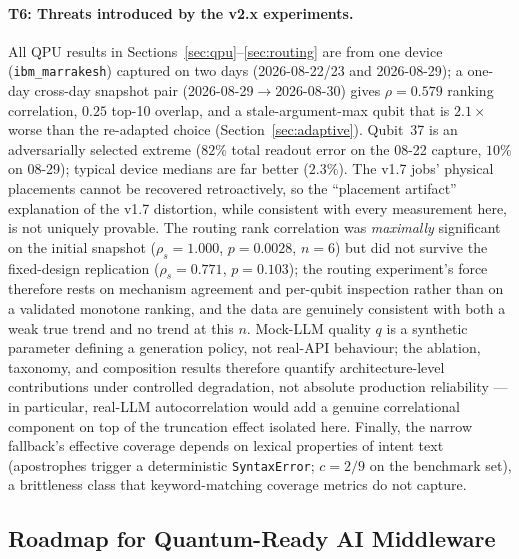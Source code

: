 ﻿\documentclass[12pt,a4paper]{article}
\begin{document}
\paragraph{T6: Threats introduced by the v2.x experiments.} All QPU results in Sections~\ref{sec:qpu}--\ref{sec:routing} are from one device (\texttt{ibm\_marrakesh}) captured on two days (2026-08-22/23 and 2026-08-29); a one-day cross-day snapshot pair (2026-08-29$\to$2026-08-30) gives $\rho{=}0.579$ ranking correlation, $0.25$ top-10 overlap, and a stale-argument-max qubit that is $2.1\times$ worse than the re-adapted choice (Section~\ref{sec:adaptive}). Qubit~37 is an adversarially selected extreme ($82\%$ total readout error on the 08-22 capture, $10\%$ on 08-29); typical device medians are far better ($2.3\%$). The v1.7 jobs' physical placements cannot be recovered retroactively, so the ``placement artifact'' explanation of the v1.7 distortion, while consistent with every measurement here, is not uniquely provable. The routing rank correlation was \emph{maximally} significant on the initial snapshot ($\rho_s = 1.000$, $p = 0.0028$, $n{=}6$) but did not survive the fixed-design replication ($\rho_s = 0.771$, $p = 0.103$); the routing experiment's force therefore rests on mechanism agreement and per-qubit inspection rather than on a validated monotone ranking, and the data are genuinely consistent with both a weak true trend and no trend at this $n$. Mock-LLM quality $q$ is a synthetic parameter defining a generation policy, not real-API behaviour; the ablation, taxonomy, and composition results therefore quantify architecture-level contributions under controlled degradation, not absolute production reliability --- in particular, real-LLM autocorrelation would add a genuine correlational component on top of the truncation effect isolated here. Finally, the narrow fallback's effective coverage depends on lexical properties of intent text (apostrophes trigger a deterministic \texttt{SyntaxError}; $c = 2/9$ on the benchmark set), a brittleness class that keyword-matching coverage metrics do not capture.

\subsection{Roadmap for Quantum-Ready AI Middleware}\label{sec:roadmap}
\end{document}
